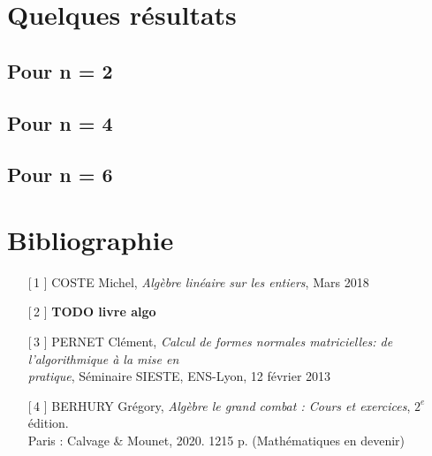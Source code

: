 \documentclass[12pt]{article}
\begin{document}
\section{Quelques résultats}
\subsection{Pour n = 2}
\subsection{Pour n = 4}
\subsection{Pour n = 6}

\newpage
\section{Bibliographie}
\begin{enumerate}

	\item[[\,1\!\!]] COSTE Michel, \textit{Algèbre linéaire sur les entiers}, Mars 2018
	\item[[\,2\!\!]] \textbf{TODO livre algo}
	\item[[\,3\!\!]] PERNET Clément, \textit{Calcul de formes normales matricielles: de
		      l'algorithmique à la mise en \\pratique}, Séminaire SIESTE, ENS-Lyon, 12 février 2013
	\item[[\,4\!\!]] BERHURY Grégory, \textit{Algèbre le grand combat : Cours et exercices},
	      $2^e$ édition.\\
	      Paris : Calvage \& Mounet, 2020. 1215 p. (Mathématiques en devenir)
\end{enumerate}
\end{document}
